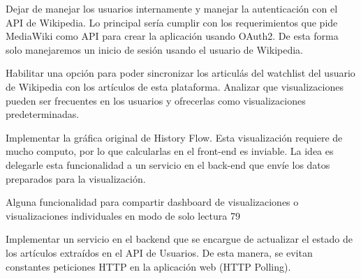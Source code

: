 \begin{list}{}{}
    \item Dejar de manejar los usuarios internamente y manejar la autenticación
          con el API de Wikipedia. Lo principal sería cumplir con los requerimientos que pide MediaWiki como API para crear la aplicación usando
          OAuth2. De esta forma solo manejaremos un inicio de sesión usando el
          usuario de Wikipedia.
    \item Habilitar una opción para poder sincronizar los articulás del watchlist
          del usuario de Wikipedia con los artículos de esta plataforma.
          Analizar que visualizaciones pueden ser frecuentes en los usuarios y
          ofrecerlas como visualizaciones predeterminadas.
    \item Implementar la gráfica original de History Flow. Esta visualización requiere de mucho computo, por lo que calcularlas en el front-end es
          inviable. La idea es delegarle esta funcionalidad a un servicio en el
          back-end que envíe los datos preparados para la visualización.
    \item Alguna funcionalidad para compartir dashboard de visualizaciones o
          visualizaciones individuales en modo de solo lectura
          79
    \item Implementar un servicio en el backend que se encargue de actualizar
          el estado de los artículos extraídos en el API de Usuarios. De esta
          manera, se evitan constantes peticiones HTTP en la aplicación web
          (HTTP Polling).
\end{list}

